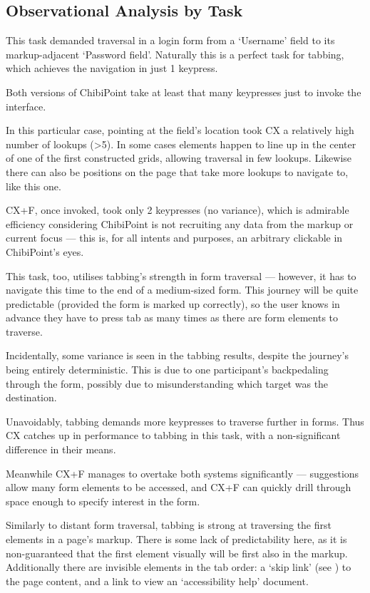 \documentclass[11pt,openright,a4paper]{report}
\begin{document}
%
%
%
%
%

\subsection{Observational Analysis by Task}
\label{sec:efficiencydiscussion}
\setcounter{TaskType}{0}
This task demanded traversal in a login form from a `Username' field to its markup-adjacent `Password field'. Naturally this is a perfect task for tabbing, which achieves the navigation in just 1 keypress.

Both versions of ChibiPoint take at least that many keypresses just to invoke the interface.

In this particular case, pointing at the field's location took CX a relatively high number of lookups (>5). In some cases elements happen to line up in the center of one of the first constructed grids, allowing traversal in few lookups. Likewise there can also be positions on the page that take more lookups to navigate to, like this one. 

CX+F, once invoked, took only 2 keypresses (no variance), which is admirable efficiency considering ChibiPoint is not recruiting any data from the markup or current focus --- this is, for all intents and purposes, an arbitrary clickable in ChibiPoint's eyes.

This task, too, utilises tabbing's strength in form traversal --- however, it has to navigate this time to the end of a medium-sized form. This journey will be quite predictable (provided the form is marked up correctly), so the user knows in advance they have to press tab as many times as there are form elements to traverse.

Incidentally, some variance is seen in the tabbing results, despite the journey's being entirely deterministic. This is due to one participant's backpedaling through the form, possibly due to misunderstanding which target was the destination.

Unavoidably, tabbing demands more keypresses to traverse further in forms. Thus CX catches up in performance to tabbing in this task, with a non-significant difference in their means.

Meanwhile CX+F manages to overtake both systems significantly --- suggestions allow many form elements to be accessed, and CX+F can quickly drill through space enough to specify interest in the form.

Similarly to distant form traversal, tabbing is strong at traversing the first elements in a page's markup. There is some lack of predictability here, as it is non-guaranteed that the first element visually will be first also in the markup. Additionally there are invisible elements in the tab order: a `skip link' (see ) to the page content, and a link to view an `accessibility help' document.
\end{document}
